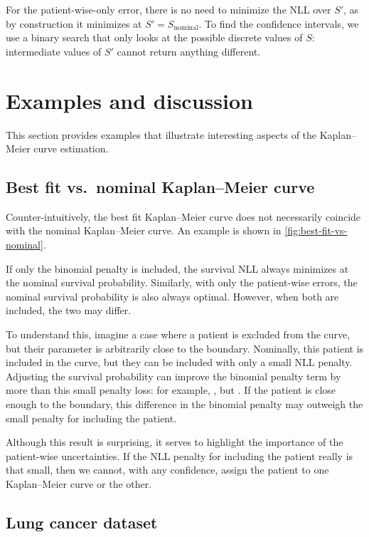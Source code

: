 \documentclass[article]{jss}
\begin{document}
For the patient-wise-only error, there is no need to minimize the NLL over \(S'\), as by construction it minimizes at \(S'=S_\text{nominal}\).  To find the confidence intervals, we use a binary search that only looks at the possible discrete values of \(S\): intermediate values of \(S'\) cannot return anything different.

\section{Examples and discussion}

This section provides examples that illustrate interesting aspects of the Kaplan--Meier curve estimation.

\subsection{Best fit vs.\ nominal Kaplan--Meier curve}

Counter-intuitively, the best fit Kaplan--Meier curve does not necessarily coincide with the nominal Kaplan--Meier curve.  An example is shown in \cref{fig:best-fit-vs-nominal}.

If only the binomial penalty is included, the survival NLL always minimizes at the nominal survival probability.  Similarly, with only the patient-wise errors, the nominal survival probability is also always optimal.  However, when both are included, the two may differ.

To understand this, imagine a case where a patient is excluded from the curve, but their parameter is arbitrarily close to the boundary.  Nominally, this patient is included in the curve, but they can be included with only a small NLL penalty.  Adjusting the survival probability can improve the binomial penalty term by more than this small penalty loss: for example, , but .  If the patient is close enough to the boundary, this difference in the binomial penalty may outweigh the small penalty for including the patient.

Although this result is surprising, it serves to highlight the importance of the patient-wise uncertainties.  If the NLL penalty for including the patient really is that small, then we cannot, with any confidence, assign the patient to one Kaplan--Meier curve or the other.

\subsection{Lung cancer dataset}
\end{document}
